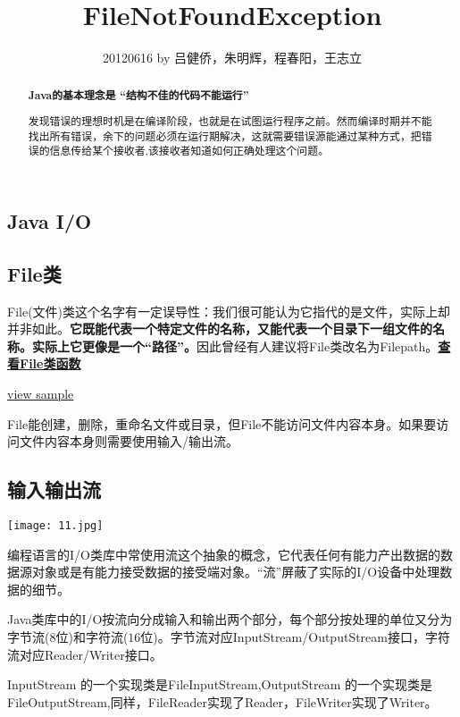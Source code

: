 \documentclass[a4paper,10pt]{article}
\title{FileNotFoundException}
\author{20120616 by 吕健侨，朱明辉，程春阳，王志立}
\begin{document}
\begin{CJK}{UTF8}{gbsn}
\maketitle
\begin{abstract}
\begin{CJK}{UTF8}{gkai}\textbf{Java的基本理念是 “结构不佳的代码不能运行”}\par
发现错误的理想时机是在编译阶段，也就是在试图运行程序之前。然而编译时期并不能找出所有错误，余下的问题必须在运行期解决，这就需要错误源能通过某种方式，把错误的信息传给某个接收者,该接收者知道如何正确处理这个问题。
\end{CJK}\par

\end{abstract}
 
\section{Java I/O}\hypertarget{FileOt}{}

\subsection{File类}
	File(文件)类这个名字有一定误导性：我们很可能认为它指代的是文件，实际上却并非如此。\textbf{它既能代表一个特定文件的名称，又能代表一个目录下一组文件的名称。实际上它更像是一个“路径”。}因此曾经有人建议将File类改名为Filepath。\hyperlink{File}{\textbf{查看File类函数}}\par

\hyperlink{testfile}{view sample}\hypertarget{rfile}{}

File能创建，删除，重命名文件或目录，但File不能访问文件内容本身。如果要访问文件内容本身则需要使用输入/输出流。\newpage

\subsection{输入输出流}
\texttt{[image: 11.jpg]}
\begin{CJK}{UTF8}{gkai}{编程语言的I/O类库中常使用流这个抽象的概念，它代表任何有能力产出数据的数据源对象或是有能力接受数据的接受端对象。“流”屏蔽了实际的I/O设备中处理数据的细节。}

\end{CJK}\par

Java类库中的I/O按流向分成输入和输出两个部分，每个部分按处理的单位又分为字节流($8$位)和字符流($16$位)。字节流对应InputStream/OutputStream接口，字符流对应Reader/Writer接口。\par
InputStream 的一个实现类是FileInputStream,OutputStream 的一个实现类是FileOutputStream,同样，FileReader实现了Reader，FileWriter实现了Writer。\par


\end{CJK}
\end{document}
